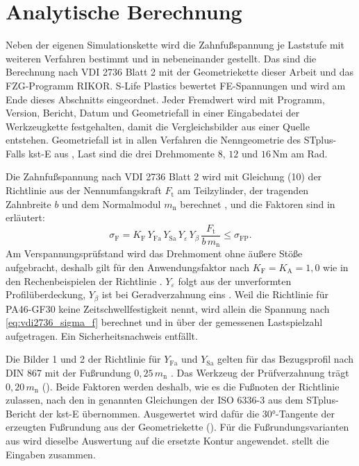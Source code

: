 \section{Analytische Berechnung}
\label{sec:analytik}

Neben der eigenen Simulationskette wird die Zahnfußspannung je Laststufe mit weiteren Verfahren bestimmt und in  nebeneinander gestellt. Das sind die Berechnung nach VDI 2736 Blatt 2 \cite[S.~11 bis 14]{VDI2736-2} mit der Geometriekette dieser Arbeit und das FZG-Programm RIKOR. S-Life Plastics bewertet FE-Spannungen und wird am Ende dieses Abschnitts eingeordnet. Jeder Fremdwert wird mit Programm, Version, Bericht, Datum und Geometriefall in einer Eingabedatei der Werkzeugkette festgehalten, damit die Vergleichsbilder aus einer Quelle entstehen. Geometriefall ist in allen Verfahren die Nenngeometrie des STplus-Falls kst-E aus , Last sind die drei Drehmomente $8$, $12$ und $16$\,Nm am Rad.

Die Zahnfußspannung nach VDI 2736 Blatt 2 wird mit Gleichung (10) der Richtlinie aus der Nennumfangskraft $F_{\mathrm{t}}$ am Teilzylinder, der tragenden Zahnbreite $b$ und dem Normalmodul $m_{\mathrm{n}}$ berechnet \cite[S.~11]{VDI2736-2}, und die Faktoren sind in  erläutert:
\begin{equation}
	\sigma_{\mathrm{F}} = K_{\mathrm{F}}\,Y_{\mathrm{Fa}}\,Y_{\mathrm{Sa}}\,Y_{\varepsilon}\,Y_{\beta}\,\frac{F_{\mathrm{t}}}{b\,m_{\mathrm{n}}} \leq \sigma_{\mathrm{FP}} .
	\label{eq:vdi2736_sigma_f}
\end{equation}
Am Verspannungsprüfstand wird das Drehmoment ohne äußere Stöße aufgebracht, deshalb gilt für den Anwendungsfaktor nach \cite[Abschnitt 5, S.~19]{ISO6336-1} $K_{\mathrm{F}} = K_{\mathrm{A}} = 1{,}0$ wie in den Rechenbeispielen der Richtlinie \cite[S.~11 und 25 bis 28]{VDI2736-2}. $Y_{\varepsilon}$ folgt aus der unverformten Profilüberdeckung, $Y_{\beta}$ ist bei Geradverzahnung eins \cite[S.~13]{VDI2736-2}. Weil die Richtlinie für PA46-GF30 keine Zeitschwellfestigkeit nennt, wird allein die Spannung nach \eqref{eq:vdi2736_sigma_f} berechnet und in  über der gemessenen Lastspielzahl aufgetragen. Ein Sicherheitsnachweis entfällt.

Die Bilder 1 und 2 der Richtlinie für $Y_{\mathrm{Fa}}$ und $Y_{\mathrm{Sa}}$ gelten für das Bezugsprofil nach DIN 867 mit der Fußrundung $0{,}25\,m_{\mathrm{n}}$ \cite[S.~12 bis 13]{VDI2736-2}. Das Werkzeug der Prüfverzahnung trägt $0{,}20\,m_{\mathrm{n}}$ (). Beide Faktoren werden deshalb, wie es die Fußnoten der Richtlinie zulassen, nach den in  genannten Gleichungen der ISO 6336-3 aus dem STplus-Bericht der kst-E übernommen. Ausgewertet wird dafür die $30$°-Tangente der erzeugten Fußrundung aus der Geometriekette (). Für die Fußrundungsvarianten aus  wird dieselbe Auswertung auf die ersetzte Kontur angewendet.  stellt die Eingaben zusammen.

